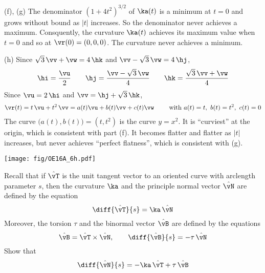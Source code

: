 \begin{solution}
\noindent (f), (g)
The denominator ${(1+4t^2)}^{3/2}$ of $\ka(t)$ is a minimum at $t=0$ and grows
without bound as $|t|$ increases. So the denominator never achieves
a maximum. Consquently, the curvature $\ka(t)$ achieves its
maximum value when $t=0$ and so at $\vr(0)=(0,0,0)$. The curvature
never achieves a minimum.

\noindent (h)
Since 
$\sqrt{3}\,\vv+\vw=4\,\hk$ and $\vv-\sqrt{3}\,\vw=4\,\hj$,
\begin{equation*}
\hi=\frac{\vu}{2}\qquad
\hj=\frac{\vv-\sqrt{3}\,\vw}{4}\qquad
\hk=\frac{\sqrt{3}\,\vv+\vw}{4}
\end{equation*}
Since $\vu=2\,\hi$ and $\vv=\hj+\sqrt{3}\,\hk$,
\begin{align*}
\vr(t) = t\,\vu + t^2 \,\vv
= a(t)\vu + b(t)\vv + c(t)\vw
\qquad\text{ with }a(t)=t,\ b(t)=t^2,\ c(t)=0
\end{align*}
The curve $\big(a(t),b(t)\big)=(t,t^2)$ is the curve $y=x^2$.
It is ``curviest'' at the origin, which is consistent with part (f).
It becomes flatter and flatter as $|t|$ increases, but never achieves
``perfect flatness'', which is consistent with (g).

\begin{center}
       \texttt{[image: fig/OE16A\_6h.pdf]}
\end{center}



\end{solution}



\begin{question}[M317 2017D] %
Recall that if $\hat\vT$ is the unit tangent vector to an oriented curve 
with arclength parameter $s$, then the curvature $\ka$ and the principle
normal vector $\hat\vN$ are defined by the equation
\begin{equation*}
\diff{\hat\vT}{s} = \ka\,\hat\vN
\end{equation*}
Moreover, the torsion $\tau$ and the binormal vector $\hat\vB$ are defined by
the equations
\begin{equation*}
\hat\vB = \hat\vT\times\hat\vN,\qquad
\diff{\hat\vB}{s} = -\tau\,\hat\vN
\end{equation*} 
Show that
\begin{equation*}
\diff{\hat\vN}{s} = -\ka\,\hat\vT + \tau\,\hat\vB
\end{equation*}
\end{question}

